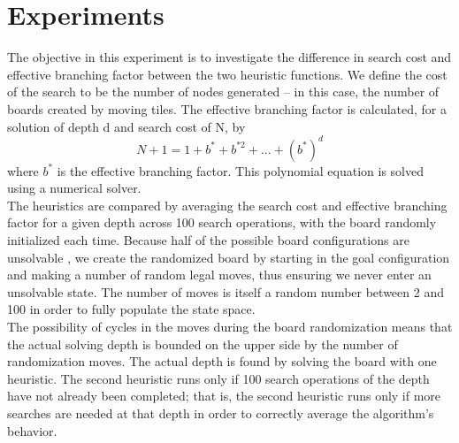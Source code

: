 
\section{Experiments}
\label{sec:expts}

The objective in this experiment is to investigate the difference in search cost and effective branching factor between the two heuristic functions.  We define the cost of the search to be the number of nodes generated -- in this case, the number of boards created by moving tiles.  The effective branching factor is calculated, for a solution of depth d and search cost of N, by 
$$ N + 1 = 1 + b^* + b^{*2} + ... + (b^*)^d $$
where $b^*$ is the effective branching factor.  This polynomial equation is solved using a numerical solver. \\

The heuristics are compared by averaging the search cost and effective branching factor for a given depth across 100 search operations, with the board randomly initialized each time.  Because half of the possible board configurations are unsolvable \cite{15notes}, we create the randomized board by starting in the goal configuration and making a number of random legal moves, thus ensuring we never enter an unsolvable state.  The number of moves is itself a random number between 2 and 100 in order to fully populate the state space. \\

The possibility of cycles in the moves during the board randomization means that the actual solving depth is bounded on the upper side by the number of randomization moves.  The actual depth is found by solving the board with one heuristic.  The second heuristic runs only if 100 search operations of the depth have not already been completed; that is, the second heuristic runs only if more searches are needed at that depth in order to correctly average the algorithm's behavior. \\

